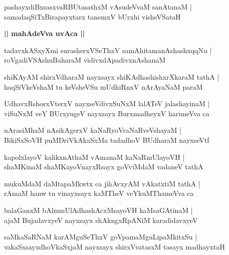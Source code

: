 \documentclass[twoside,12pt,openright]{book}
\newcounter{shloka}[chapter]
\def\uvaca#1{\centerline{{\large\textbf{#1}}}}
\begin{document}
\begin{shloka}%
pashayxdiBxsasxvaRBUtasathxM vAsudeVvaM sanAtanaM |\\
samadaqSiTxBirapayxtarx tanemxV bUrxhi visheVSataH 
\end{shloka}

\uvaca{|| mahAdeVva uvAca ||}

\begin{shloka}%
tadavxkASxyXmi surasherxVSeThxV samAhitamanAshashxqqNu |\\
roVgadiVSAshuBaharaM vidivxdApadivxnAshanaM 
\end{shloka}

\begin{shloka}%
shiKAyAM shirxVdharaM nayxsayx shiKAdhashishxrXkaraM tathA |\\
haqSiVkeVshaM tu keVsheVSu mUdhiRnxV nArAyaNaM paraM 
\end{shloka}

\begin{shloka}%
UdhavxRshorxVterxV nayxseVdivxSuNxM lalATeV jalashayinaM |\\
viSuNxM veY BUrxyugeV nayxsayx BurxmadheyxV harimeVva ca 
\end{shloka}

\begin{shloka}%
nArasiMhaM nAsikAgerxV kaNaRyoVraNaRveVshayaM |\\
BikiSxSoVH puMDriVkAkaSxMa tadadhoV BUdharaM nayxseVtf
\end{shloka}

\begin{shloka}%
kapolxlayoV kalikxnAthaM vAmanaM kaNaRmUlayoVH |\\
shaMKinaM shaMKayoVnayxRsayx goVviMdaM vadaneV tathA 
\end{shloka}

\begin{shloka}%
mukuMdaM daMtapaMkwtx ca jihAvxyAM vAkatxtiM tathA |\\
rAmaM hanw tu vinayxsayx kaMTheV veYkuMThameVva ca
\end{shloka}

\begin{shloka}%
balaGanxM bAhumUlAdhashAcxMsayoVH kaMsaGAtinaM |\\
ajaM BujadavxyeV nayxsayx shAkngxRpANiM karadidavxyeV 
\end{shloka}

\begin{shloka}%
saMkaSaRNaM karAMguSeThxV goVpamaMguLipaMkitxSu |\\
vakaSxsayxdhoVkaSxjaM nayxsayx shirxVvatasxM tasayx madhayxtaH 
\end{shloka}
\end{document}
